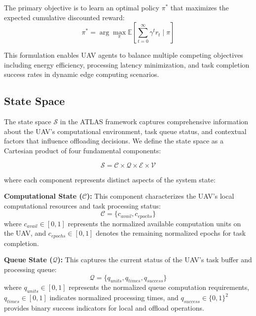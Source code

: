 \documentclass[journal]{IEEEtran}
\begin{document}
The primary objective is to learn an optimal policy $\pi^*$ that maximizes the expected cumulative discounted reward:
\begin{equation}
\pi^* = \arg\max_\pi \mathbb{E}\left[\sum_{t=0}^{\infty} \gamma^t r_t \mid \pi\right]
\end{equation}

This formulation enables UAV agents to balance multiple competing objectives including energy efficiency, processing latency minimization, and task completion success rates in dynamic edge computing scenarios.

\subsection{State Space}

The state space $\mathcal{S}$ in the ATLAS framework captures comprehensive information about the UAV's computational environment, task queue status, and contextual factors that influence offloading decisions. We define the state space as a Cartesian product of four fundamental components:

\begin{equation}
\mathcal{S} = \mathcal{C} \times \mathcal{Q} \times \mathcal{E} \times \mathcal{V}
\end{equation}

where each component represents distinct aspects of the system state:

\textbf{Computational State ($\mathcal{C}$):} This component characterizes the UAV's local computational resources and task processing status:
\begin{equation}
\mathcal{C} = \{c_{avail}, c_{epochs}\}
\end{equation}
where $c_{avail} \in [0, 1]$ represents the normalized available computation units on the UAV, and $c_{epochs} \in [0, 1]$ denotes the remaining normalized epochs for task completion.

\textbf{Queue State ($\mathcal{Q}$):} This captures the current status of the UAV's task buffer and processing queue:
\begin{equation}
\mathcal{Q} = \{q_{units}, q_{times}, q_{success}\}
\end{equation}
where $q_{units} \in [0, 1]$ represents the normalized queue computation requirements, $q_{times} \in [0, 1]$ indicates normalized processing times, and $q_{success} \in \{0, 1\}^2$ provides binary success indicators for local and offload operations.
\end{document}
